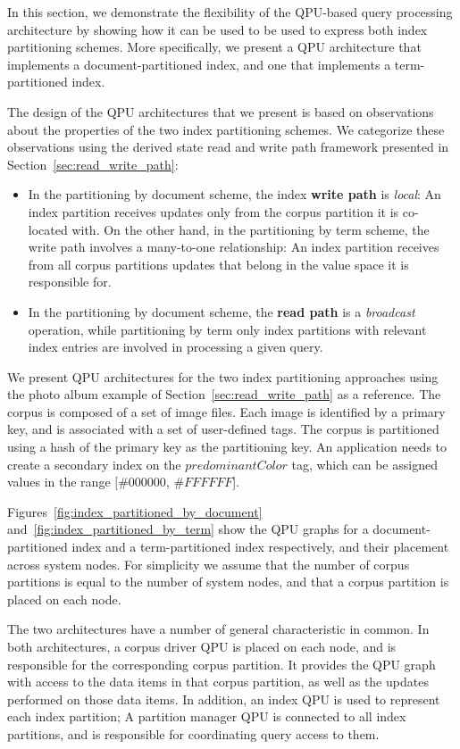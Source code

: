 In this section, we demonstrate the flexibility of the QPU-based query processing architecture by showing how it can be used to
be used to express both index partitioning schemes.
More specifically,
we present a QPU architecture that implements a document-partitioned index,
and one that implements a term-partitioned index.

The design of the QPU architectures that we present is based on observations about the properties of the two index partitioning schemes.
We categorize these observations using the derived state read and write path framework presented in
Section~\ref{sec:read_write_path}:
\begin{itemize}
  \item In the partitioning by document scheme,
  the index \textbf{write path} is \textit{local}:
  An index partition receives updates only from the corpus partition it is co-located with.
  On the other hand, in the partitioning by term scheme,
  the write path involves a many-to-one relationship:
  An index partition receives from all corpus partitions updates that belong in the value space it is responsible for.

  \item In the partitioning by document scheme,
  the \textbf{read path} is a \textit{broadcast} operation,
  while partitioning by term
  only index partitions with relevant index entries are involved in processing a given query.
\end{itemize}

We present QPU architectures for the two index partitioning approaches using the photo album example of Section~\ref{sec:read_write_path} as a reference.
The corpus is composed of a set of image files.
Each image is identified by a primary key, and is associated with a set of user-defined tags.
The corpus is partitioned using a hash of the primary key as the partitioning key.
An application needs to create a secondary index on the $predominantColor$ tag, which can be assigned values in the range $[\#000000$, $\#FFFFFF$].

Figures~\ref{fig:index_partitioned_by_document} and~\ref{fig:index_partitioned_by_term} show the QPU graphs for a
document-partitioned index and a term-partitioned index respectively, and their placement across system nodes.
For simplicity we assume that the number of corpus partitions is equal to the number of system nodes,
and that a corpus partition is placed on each node.

The two architectures have a number of general characteristic in common.
In both architectures, a corpus driver QPU is placed on each node,
and is responsible for the corresponding corpus partition.
It provides the QPU graph with access to the data items in that corpus partition,
as well as the updates performed on those data items.
In addition, an index QPU is used to represent each index partition;
A partition manager QPU is connected to all index partitions,
and is responsible for coordinating query access to them.

